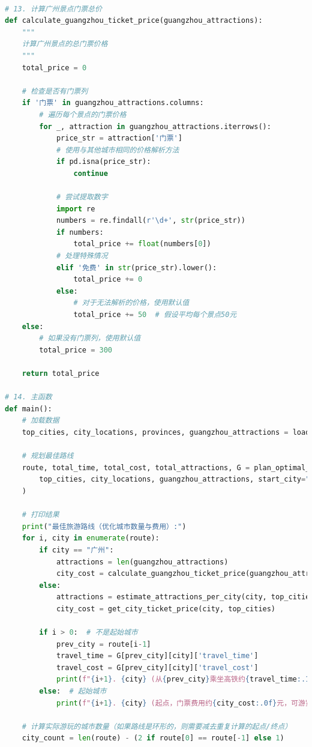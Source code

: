 \documentclass[withoutpreface,bwprint]{cumcmthesis} %
\begin{document}
\begin{appendices}
\begin{lstlisting}[language=python]
    
# 13. 计算广州景点门票总价
def calculate_guangzhou_ticket_price(guangzhou_attractions):
    """
    计算广州景点的总门票价格
    """
    total_price = 0
    
    # 检查是否有门票列
    if '门票' in guangzhou_attractions.columns:
        # 遍历每个景点的门票价格
        for _, attraction in guangzhou_attractions.iterrows():
            price_str = attraction['门票']
            # 使用与其他城市相同的价格解析方法
            if pd.isna(price_str):
                continue
            
            # 尝试提取数字
            import re
            numbers = re.findall(r'\d+', str(price_str))
            if numbers:
                total_price += float(numbers[0])
            # 处理特殊情况
            elif '免费' in str(price_str).lower():
                total_price += 0
            else:
                # 对于无法解析的价格，使用默认值
                total_price += 50  # 假设平均每个景点50元
    else:
        # 如果没有门票列，使用默认值
        total_price = 300
    
    return total_price

# 14. 主函数
def main():
    # 加载数据
    top_cities, city_locations, provinces, guangzhou_attractions = load_data()
    
    # 规划最佳路线
    route, total_time, total_cost, total_attractions, G = plan_optimal_route(
        top_cities, city_locations, guangzhou_attractions, start_city="广州", max_hours=144
    )
    
    # 打印结果
    print("最佳旅游路线（优化城市数量与费用）:")
    for i, city in enumerate(route):
        if city == "广州":
            attractions = len(guangzhou_attractions)
            city_cost = calculate_guangzhou_ticket_price(guangzhou_attractions)
        else:
            attractions = estimate_attractions_per_city(city, top_cities)
            city_cost = get_city_ticket_price(city, top_cities)
            
        if i > 0:  # 不是起始城市
            prev_city = route[i-1]
            travel_time = G[prev_city][city]['travel_time']
            travel_cost = G[prev_city][city]['travel_cost']
            print(f"{i+1}. {city} (从{prev_city}乘坐高铁约{travel_time:.1f}小时，交通费用{travel_cost:.0f}元，门票费用约{city_cost:.0f}元，可游览{attractions}个景点)")
        else:  # 起始城市
            print(f"{i+1}. {city} (起点，门票费用约{city_cost:.0f}元，可游览{attractions}个景点)")
    
    # 计算实际游玩的城市数量（如果路线是环形的，则需要减去重复计算的起点/终点）
    city_count = len(route) - (2 if route[0] == route[-1] else 1)
    

\end{lstlisting}
\end{appendices}
\end{document}
